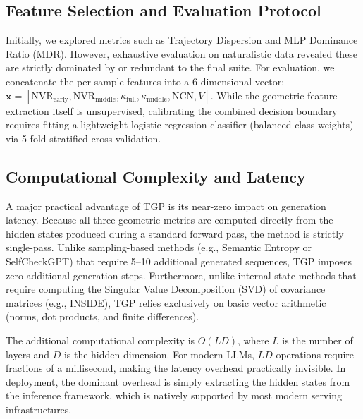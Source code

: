 \documentclass[10pt]{article}
\newcommand{\tgp}{\textsc{TGP}\xspace}
\newcommand{\nvr}{\text{NVR}}
\begin{document}
\subsection{Feature Selection and Evaluation Protocol}
\label{sec:combined}

Initially, we explored metrics such as Trajectory Dispersion and MLP Dominance Ratio (MDR). However, exhaustive evaluation on naturalistic data revealed these are strictly dominated by or redundant to the final suite.
For evaluation, we concatenate the per-sample features into a 6-dimensional vector: $\mathbf{x} = [\nvr_{\text{early}}, \nvr_{\text{middle}}, \kappa_{\text{full}}, \kappa_{\text{middle}}, \text{NCN}, V]$.
While the geometric feature extraction itself is unsupervised, calibrating the combined decision boundary requires fitting a lightweight logistic regression classifier (balanced class weights) via 5-fold stratified cross-validation.\n\n\subsection{Computational Complexity and Latency}
\label{sec:latency}
A major practical advantage of \tgp is its near-zero impact on generation latency.
Because all three geometric metrics are computed directly from the hidden states produced during a standard forward pass, the method is strictly single-pass.
Unlike sampling-based methods (e.g., Semantic Entropy or SelfCheckGPT) that require 5--10 additional generated sequences, \tgp imposes zero additional generation steps.
Furthermore, unlike internal-state methods that require computing the Singular Value Decomposition (SVD) of covariance matrices (e.g., INSIDE), \tgp relies exclusively on basic vector arithmetic (norms, dot products, and finite differences).

The additional computational complexity is $O(LD)$, where $L$ is the number of layers and $D$ is the hidden dimension.
For modern LLMs, $LD$ operations require fractions of a millisecond, making the latency overhead practically invisible. In deployment, the dominant overhead is simply extracting the hidden states from the inference framework, which is natively supported by most modern serving infrastructures.
\end{document}
